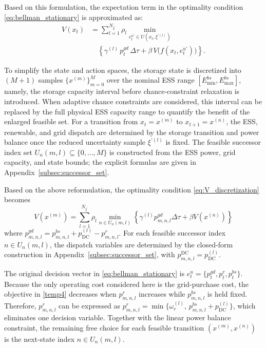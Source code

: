 \documentclass[a4paper,fleqn]{cas-dc}
\theoremstyle{plain}
\theoremstyle{remark}
\theoremstyle{plain}
\begin{document}
Based on this formulation, the expectation term in the optimality condition \eqref{eq:bellman_stationary} is approximated as:
\begin{equation}\label{eq:V_discretization}
\begin{aligned}
V(x_t)
&=\sum_{l=1}^{N_{\xi^{'}}} \rho_l
\min_{e_t^{u'} \in U\left(x_t, \xi^{'(l)}\right)} \\
&\quad \left\{\gamma^{(l)}\, p_t^{gd}\, \Delta \tau
+\beta\, V\!\big(f(x_t,e_t^{u'})\big)\right\}.
\end{aligned}
\end{equation}

To simplify the state and action spaces, the storage state is discretized into $(M+1)$ samples $\{x^{(m)}\}_{m=0}^M$ over the nominal ESS range $[E_{\min }^{bs}, E_{\max }^{bs}]$, namely, the storage capacity interval before chance-constraint relaxation is introduced. When adaptive chance constraints are considered, this interval can be replaced by the full physical ESS capacity range to quantify the benefit of the enlarged feasible set. For a transition from $x_t=x^{(m)}$ to $x_{t+1}=x^{(n)}$, the ESS, renewable, and grid dispatch are determined by the storage transition and power balance once the reduced uncertainty sample $\xi^{\prime(l)}$ is fixed. The feasible successor index set $U_n(m,l)\subseteq\{0,\ldots,M\}$ is constructed from the ESS power, grid capacity, and state bounds; the explicit formulas are given in Appendix~\ref{subsec:successor_set}.

Based on the above reformulation, the optimality condition \eqref{eq:V_discretization} becomes
\begin{equation}\label{temp4}
V\left(x^{(m)}\right)=\sum_{l=1}^{N_{\xi^{'}}} \rho_l \min _{n \in U_n(m, l)}\left\{\gamma^{(l)} p_{m, n, l}^{gd} \Delta \tau+\beta V\left(x^{(n)}\right)\right\}
\end{equation}
where $p_{m,n,l}^{gd}=p_{m,n,l}^{bs}+p_{\mathrm{DC}}^{(l)}-p_{m,n,l}^r$. For each feasible successor index $n \in U_n(m,l)$, the dispatch variables are determined by the closed-form construction in Appendix~\ref{subsec:successor_set}, with $p_{m,n,l}^{\text{DC}}=p_{\text{DC}}^{(l)}$.

The original decision vector in \eqref{eq:bellman_stationary} is $e_t^u=\{p_t^{gd}, p_t^{r}, p_t^{bs}\}$. Because the only operating cost considered here is the grid-purchase cost, the objective in \eqref{temp4} decreases when $p_{m,n,l}^{r}$ increases while $p_{m,n,l}^{bs}$ is held fixed. Therefore, $p_{m,n,l}^{r}$ can be expressed as $p_{m,n,l}^{r}=\min\{\omega_r^{(l)},\, p_{m,n,l}^{bs}+p_{\text{DC}}^{(l)}\}$, which eliminates one decision variable. Together with the linear power balance constraint, the remaining free choice for each feasible transition $(x^{(m)},x^{(n)})$ is the next-state index $n\in U_n(m,l)$.
\end{document}
